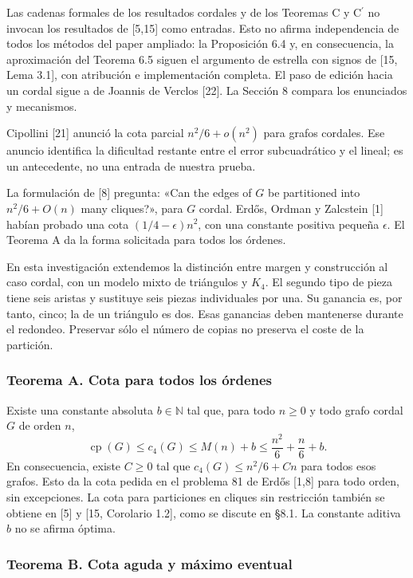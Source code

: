 \documentclass[spanish,11pt,a4paper]{article}
\begin{document}
Las cadenas formales de los resultados cordales y de los Teoremas C y \texorpdfstring{C\ensuremath{^{\prime}}}{C'} no invocan los resultados de {[}5,15{]} como entradas. Esto no afirma independencia de todos los métodos del paper ampliado: la Proposición 6.4 y, en consecuencia, la aproximación del Teorema 6.5 siguen el argumento de estrella con signos de {[}15, Lema 3.1{]}, con atribución e implementación completa. El paso de edición hacia un cordal sigue a de Joannis de Verclos {[}22{]}. La Sección 8 compara los enunciados y mecanismos.

Cipollini {[}21{]} anunció la cota parcial \(n^2/6+o(n^2)\) para grafos cordales. Ese anuncio identifica la dificultad restante entre el error subcuadrático y el lineal; es un antecedente, no una entrada de nuestra prueba.

La formulación de {[}8{]} pregunta: «Can the edges of \(G\) be partitioned into \(n^2/6+O(n)\) many cliques?», para \(G\) cordal. Erdős, Ordman y Zalcstein {[}1{]} habían probado una cota \((1/4-\epsilon)n^2\), con una constante positiva pequeña \(\epsilon\). El Teorema A da la forma solicitada para todos los órdenes.

En esta investigación extendemos la distinción entre margen y construcción al caso cordal, con un modelo mixto de triángulos y \(K_4\). El segundo tipo de pieza tiene seis aristas y sustituye seis piezas individuales por una. Su ganancia es, por tanto, cinco; la de un triángulo es dos. Esas ganancias deben mantenerse durante el redondeo. Preservar sólo el número de copias no preserva el coste de la partición.

\subsubsection{Teorema A. Cota para todos los órdenes}\label{teorema-a.-cota-para-todos-los-ordenes}

Existe una constante absoluta \(b\in\mathbb N\) tal que, para todo \(n\ge0\) y todo grafo cordal \(G\) de orden \(n\), \[
\operatorname{cp}(G)\le c_4(G)\le M(n)+b
\le\frac{n^2}{6}+\frac n6+b.
\tag{A}
\] En consecuencia, existe \(C\ge0\) tal que \(c_4(G)\le n^2/6+Cn\) para todos esos grafos. Esto da la cota pedida en el problema 81 de Erdős {[}1,8{]} para todo orden, sin excepciones. La cota para particiones en cliques sin restricción también se obtiene en {[}5{]} y {[}15, Corolario 1.2{]}, como se discute en §8.1. La constante aditiva \(b\) no se afirma óptima.

\subsubsection{Teorema B. Cota aguda y máximo eventual}\label{teorema-b.-cota-aguda-y-maximo-eventual}
\end{document}
